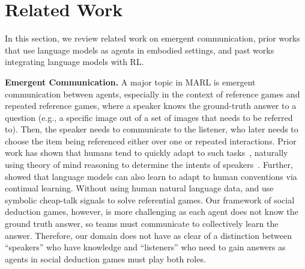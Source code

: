 \section{Related Work}
In this section, we review related work on emergent communication, prior works that use language models as agents in embodied settings, and past works integrating language models with RL.

\smallskip

\noindent \textbf{Emergent Communication.} A major topic in MARL is emergent communication between agents, especially in the context of reference games and repeated reference games, where a speaker knows the ground-truth answer to a question (e.g., a specific image out of a set of images that needs to be referred to). Then, the speaker needs to communicate to the listener, who later needs to choose the item being referenced either over one or repeated interactions.
Prior work has shown that humans tend to quickly adapt to such tasks~\cite{mccarthy2021learning}, naturally using theory of mind reasoning to determine the intents of speakers~\cite{FRANK201480}. Further, \citet{hawkins-etal-2020-continual} showed that language models can also learn to adapt to human conventions via continual learning. Without using human natural language data, \citet{Lazaridou2016} and \citet{Havrylov} use symbolic cheap-talk signals to solve referential games. Our framework of social deduction games, however, is more challenging as each agent does not know the ground truth answer, so teams must communicate to collectively learn the answer. Therefore, our domain does not have as clear of a distinction between ``speakers'' who have knowledge and ``listeners'' who need to gain answers as agents in social deduction games must play both roles.

\smallskip

